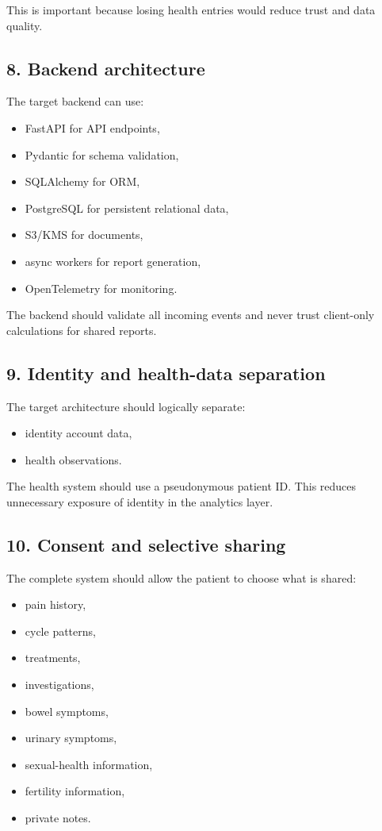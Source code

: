 \documentclass[11pt,a4paper]{article}
\begin{document}
This is important because losing health entries would reduce trust and data quality.

\subsection{8. Backend architecture}

The target backend can use:

\begin{itemize}
  \item FastAPI for API endpoints,
  \item Pydantic for schema validation,
  \item SQLAlchemy for ORM,
  \item PostgreSQL for persistent relational data,
  \item S3/KMS for documents,
  \item async workers for report generation,
  \item OpenTelemetry for monitoring.
\end{itemize}

The backend should validate all incoming events and never trust client-only calculations for shared reports.

\subsection{9. Identity and health-data separation}

The target architecture should logically separate:

\begin{itemize}
  \item identity account data,
  \item health observations.
\end{itemize}

The health system should use a pseudonymous patient ID. This reduces unnecessary exposure of identity in the analytics layer.

\subsection{10. Consent and selective sharing}

The complete system should allow the patient to choose what is shared:

\begin{itemize}
  \item pain history,
  \item cycle patterns,
  \item treatments,
  \item investigations,
  \item bowel symptoms,
  \item urinary symptoms,
  \item sexual-health information,
  \item fertility information,
  \item private notes.
\end{itemize}
\end{document}
